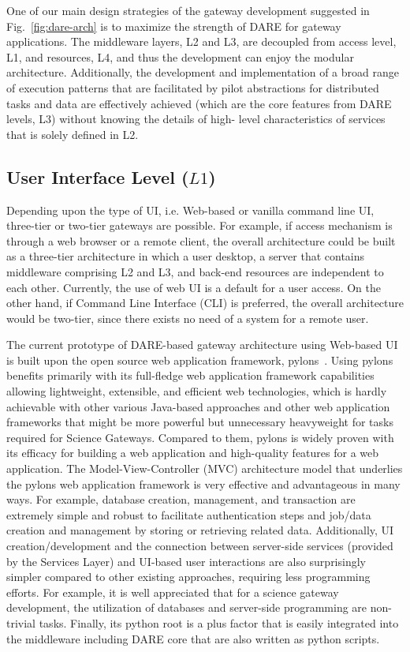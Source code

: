 \documentclass[]{svjour3}
\begin{document}
 One of
our main design strategies of the gateway development suggested in
Fig.~\ref{fig:dare-arch} is to maximize the strength of DARE for
gateway applications.  The middleware layers, L2 and L3, are decoupled
from access level, L1, and resources, L4, and thus the development can
enjoy the modular architecture. Additionally, the development and
implementation of a broad range of execution patterns that are
facilitated by pilot abstractions for distributed tasks and data are
effectively achieved (which are the core features from DARE levels,
L3) without knowing the details of high- level characteristics of
services that is solely defined in L2.

\subsection{User Interface Level ($L1$)}
 Depending upon the
type of UI, i.e. Web-based or vanilla command line UI, three-tier or
two-tier gateways are possible. For example, if access mechanism is
through a web browser or a remote client, the overall architecture
could be built as a three-tier architecture in which a user desktop, a
server that contains middleware comprising L2 and L3, and back-end
resources are independent to each other. Currently, the use of web UI
is a default for a user access. On the other hand, if Command Line
Interface (CLI) is preferred, the overall architecture would be
two-tier, since there exists no need of a system for a remote user.
 
The current prototype of DARE-based gateway architecture using
Web-based UI is built upon the open source web application framework,
pylons~\cite{pylonsurl}. Using pylons benefits primarily with its
full-fledge web application framework capabilities allowing
lightweight, extensible, and efficient web technologies, which is
hardly achievable with other various Java-based approaches and other
web application frameworks that might be more powerful but unnecessary
heavyweight for tasks required for Science Gateways. Compared to them,
pylons is widely proven with its efficacy for building a web
application and high-quality features for a web application.  The
Model-View-Controller (MVC) architecture model that underlies the
pylons web application framework \cite{pylonsurl} is very effective
and advantageous in many ways. For example, database creation,
management, and transaction are extremely simple and robust to
facilitate authentication steps and job/data creation and management
by storing or retrieving related data. Additionally, UI
creation/development and the connection between server-side services
(provided by the Services Layer) and UI-based user interactions are
also surprisingly simpler compared to other existing approaches,
requiring less programming efforts. For example, it is well
appreciated that for a science gateway development, the utilization of
databases and server-side programming are non-trivial tasks. Finally,
its python root is a plus factor that is easily integrated into the
middleware including DARE core that are also written as python
scripts.
\end{document}
